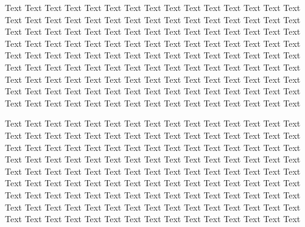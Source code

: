 Text Text Text Text Text Text Text Text Text Text Text Text Text Text Text 
Text Text Text Text Text Text Text Text Text Text Text Text Text Text Text 
Text Text Text Text Text Text Text Text Text Text Text Text Text Text Text 
Text Text Text Text Text Text Text Text Text Text Text Text Text Text Text 
Text Text Text Text Text Text Text Text Text Text Text Text Text Text Text 
Text Text Text Text Text Text Text Text Text Text Text Text Text Text Text 
Text Text Text Text Text Text Text Text Text Text Text Text Text Text Text 
Text Text Text Text Text Text Text Text Text Text Text Text Text Text Text 
Text Text Text Text Text Text Text Text Text Text Text Text Text Text Text 

Text Text Text Text Text Text Text Text Text Text Text Text Text Text Text 
Text Text Text Text Text Text Text Text Text Text Text Text Text Text Text 
Text Text Text Text Text Text Text Text Text Text Text Text Text Text Text 
Text Text Text Text Text Text Text Text Text Text Text Text Text Text Text 
Text Text Text Text Text Text Text Text Text Text Text Text Text Text Text 
Text Text Text Text Text Text Text Text Text Text Text Text Text Text Text 
Text Text Text Text Text Text Text Text Text Text Text Text Text Text Text 
Text Text Text Text Text Text Text Text Text Text Text Text Text Text Text 
Text Text Text Text Text Text Text Text Text Text Text Text Text Text Text 
